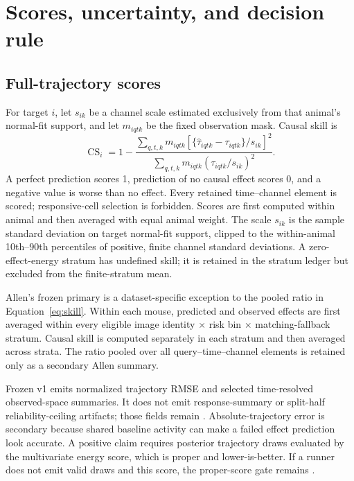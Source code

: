 \documentclass[11pt]{article}
\newcommand{\CS}{\operatorname{CS}}
\begin{document}
\section{Scores, uncertainty, and decision rule}
\label{sec:evaluation}

\subsection{Full-trajectory scores}

For target \(i\), let \(s_{ik}\) be a channel scale estimated exclusively from
that animal's normal-fit support, and let \(m_{iqtk}\) be the fixed observation
mask. Causal skill is
\begin{equation}
  \CS_i
  =
  1-
  \frac{
    \sum_{q,t,k}m_{iqtk}
      \left[
      \{\widehat{\tau}_{iqtk}-\tau_{iqtk}\}/s_{ik}
      \right]^2
  }{
    \sum_{q,t,k}m_{iqtk}
      \left(\tau_{iqtk}/s_{ik}\right)^2
  }.
  \label{eq:skill}
\end{equation}
A perfect prediction scores 1, prediction of no causal effect scores 0, and a
negative value is worse than no effect. Every retained time--channel element
is scored; responsive-cell selection is forbidden. Scores are first computed
within animal and then averaged with equal animal weight.
The scale \(s_{ik}\) is the sample standard deviation on target normal-fit
support, clipped to the within-animal 10th--90th percentiles of positive,
finite channel standard deviations. A zero-effect-energy stratum has undefined
skill; it is retained in the stratum ledger but excluded from the finite-stratum
mean.

Allen's frozen primary is a dataset-specific exception to the pooled ratio in
Equation~\ref{eq:skill}. Within each mouse, predicted and observed effects are
first averaged within every eligible image identity \(\times\) risk bin
\(\times\) matching-fallback stratum. Causal skill is computed separately in
each stratum and then averaged across strata. The ratio pooled over all
query--time--channel elements is retained only as a secondary Allen summary.

Frozen v1 emits normalized trajectory RMSE and selected time-resolved
observed-space summaries. It does not emit response-summary or split-half
reliability-ceiling artifacts; those fields remain \NotEvaluated{}.
Absolute-trajectory error is secondary because shared baseline activity can
make a failed effect prediction look accurate.
A positive claim requires posterior trajectory draws evaluated by the
multivariate energy score, which is proper and lower-is-better. If a runner
does not emit valid draws and this score, the proper-score gate remains
\NotEvaluated{}.
\end{document}
